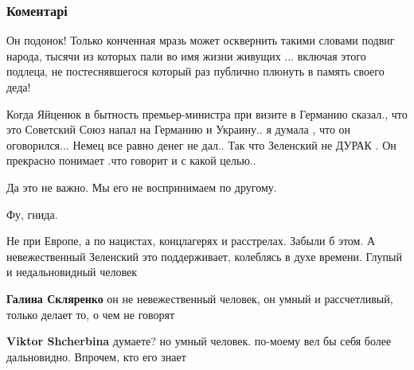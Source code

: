  
 
 
 
 
\subsubsection{Коментарі}
\label{sec:07_11_2021.fb.zharkih_denis.1.glupost_zelja_osvobozhdenie_kieva.cmt}

\begin{itemize} %

Он подонок! Только конченная мразь может осквернить такими словами подвиг
народа, тысячи из которых пали во имя жизни живущих ... включая этого подлеца,
не постеснявшегося который раз публично плюнуть в память своего деда!


Когда Яйценюк в бытность премьер-министра при визите в Германию сказал., что
это Советский Союз напал на Германию и Украину.. я думала , что он
оговорился... Немец все равно денег не дал.. Так что Зеленский не ДУРАК . Он
прекрасно понимает .что говорит и с какой целью..

\begin{itemize} %
Да это не важно. Мы его не воспринимаем по другому.
\end{itemize} %

Фу, гнида.


Не при Европе, а по нацистах, концлагерях и расстрелах. Забыли б этом. А
невежественный Зеленский это поддерживает, колеблясь в духе времени. Глупый и
недальновидный человек

\begin{itemize} %
\textbf{Галина Скляренко} он не невежественный человек, он умный и рассчетливый, только делает то, о чем не говорят

\textbf{Viktor Shcherbina} думаете? но умный человек. по-моему вел бы себя более дальновидно. Впрочем, кто его знает
\end{itemize} %


\end{itemize}
